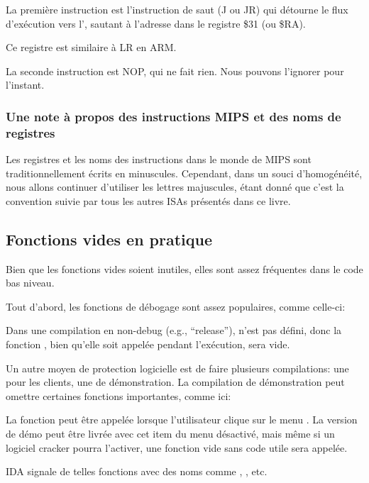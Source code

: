 La première instruction est l'instruction de saut (J ou JR) qui détourne le flux
d'exécution vers l', sautant à l'adresse dans le registre
\$31 (ou \$RA).

Ce registre est similaire à \ac{LR} en ARM.

La seconde instruction est \ac{NOP}, qui ne fait rien.
Nous pouvons l'ignorer pour l'instant.

\subsubsection{Une note à propos des instructions MIPS et des noms de registres}

Les registres et les noms des instructions dans le monde de MIPS sont traditionnellement écrits en minuscules.
Cependant, dans un souci d'homogénéité, nous allons continuer d'utiliser les lettres majuscules,
étant donné que c'est la convention suivie par tous les autres \ac{ISA}s présentés dans ce livre.

\subsection{Fonctions vides en pratique}

Bien que les fonctions vides soient inutiles, elles sont assez fréquentes dans le code bas niveau.

Tout d'abord, les fonctions de débogage sont assez populaires, comme celle-ci:



Dans une compilation en non-debug (e.g., ``release''),  n'est pas défini,
donc la fonction , bien qu'elle soit appelée pendant l'exécution,
sera vide.

Un autre moyen de protection logicielle est de faire plusieurs compilations: une pour les clients, une de démonstration.
La compilation de démonstration peut omettre certaines fonctions importantes, comme ici:



La fonction  peut être appelée lorsque l'utilisateur clique sur le menu .
La version de démo peut être livrée avec cet item du menu désactivé, mais même si un logiciel cracker pourra l'activer,
une fonction vide sans code utile sera appelée.

IDA signale de telles fonctions avec des noms comme , , etc.


